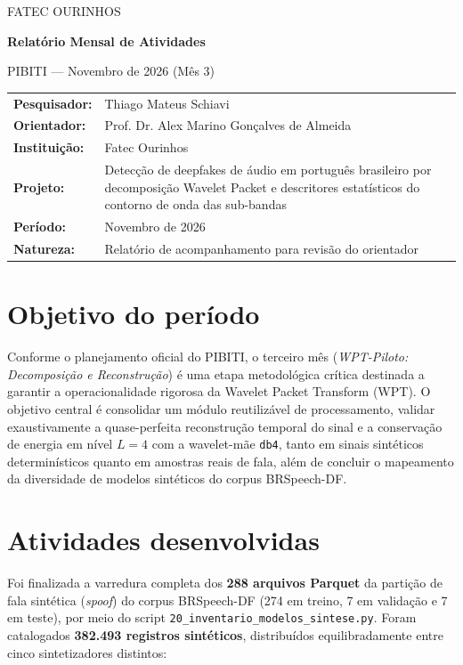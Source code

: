 \documentclass[11pt,a4paper]{article}
\newcommand{\subtitulo}[1]{\vspace{4pt}{\large\bfseries #1}\par\vspace{2pt}}
\begin{document}
\begin{center}
{\small FATEC OURINHOS}\par
\vspace{0.4cm}
{\Large\bfseries Relatório Mensal de Atividades}\par
\vspace{0.18cm}
{\large PIBITI --- Novembro de 2026 (Mês 3)}\par
\vspace{0.6cm}
\end{center}

\begin{tabularx}{\linewidth}{@{}lX@{}}
\textbf{Pesquisador:} & Thiago Mateus Schiavi\\
\textbf{Orientador:} & Prof. Dr. Alex Marino Gonçalves de Almeida\\
\textbf{Instituição:} & Fatec Ourinhos\\
\textbf{Projeto:} & Detecção de deepfakes de áudio em português brasileiro por decomposição Wavelet Packet e descritores estatísticos do contorno de onda das sub-bandas\\
\textbf{Período:} & Novembro de 2026\\
\textbf{Natureza:} & Relatório de acompanhamento para revisão do orientador\\
\end{tabularx}
\vspace{0.35cm}

\section{Objetivo do período}
Conforme o planejamento oficial do PIBITI, o terceiro mês (\emph{WPT-Piloto: Decomposição e Reconstrução}) é uma etapa metodológica crítica destinada a garantir a operacionalidade rigorosa da Wavelet Packet Transform (WPT). O objetivo central é consolidar um módulo reutilizável de processamento, validar exaustivamente a quase-perfeita reconstrução temporal do sinal e a conservação de energia em nível $L=4$ com a wavelet-mãe \texttt{db4}, tanto em sinais sintéticos determinísticos quanto em amostras reais de fala, além de concluir o mapeamento da diversidade de modelos sintéticos do corpus BRSpeech-DF.

\section{Atividades desenvolvidas}

\subtitulo{2.1 Conclusão do inventário dos modelos sintéticos (BRSpeech-DF)}
Foi finalizada a varredura completa dos \textbf{288 arquivos Parquet} da partição de fala sintética (\emph{spoof}) do corpus BRSpeech-DF (274 em treino, 7 em validação e 7 em teste), por meio do script \texttt{20\_inventario\_modelos\_sintese.py}. Foram catalogados \textbf{382.493 registros sintéticos}, distribuídos equilibradamente entre cinco sintetizadores distintos:
\end{document}

